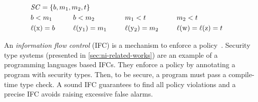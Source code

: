 \begin{center}
\begin{minipage}{.68\textwidth}
\begin{alignat*}{7}
& \SCset = \{b, m_1, m_2, t\} \span \span \\ %
& b < m_1 & \hspace{1.6em} & b < m_2 & \hspace{1.6em} & m_1 < t &\hspace{1.6em} & m_2 < t\\
& \lvl{\prc|x|} = b && \lvl{\prc|y$_1$|} = m_1 && \lvl{\prc|y$_2$|}= m_2 && \lvl{\prc|w|} =  \lvl{\prc|z|}  = t
\end{alignat*}
\end{minipage}\hfill%
\begin{minipage}{.3\textwidth}\hfill%
\end{minipage}
\end{center}

An \emph{information flow control} (IFC) is a mechanism to enforce a
policy~\cite{bishop2003}. Security type systems (presented in
\autoref{sec:ni-related-works}) are an example of a programming languages based
IFCs. They enforce a policy by annotating a program with security types. Then,
to be secure, a program must pass a compile-time type check. A sound IFC
guarantees to find all policy violations and a precise IFC avoids raising
excessive false alarms.

